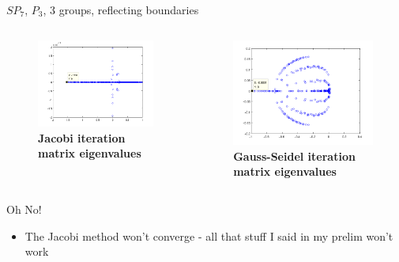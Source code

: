 \documentclass{beamer}
\begin{document}
\begin{frame}{$SP_7$, $P_3$, 3 groups, reflecting boundaries}

  \begin{columns}

    \begin{column}{0.5\textwidth}
      \begin{figure}[h!]
        \centering
        \includegraphics[width=2.5in,clip]{SPn7P3G3.png}
        \caption{\textbf{Jacobi iteration matrix eigenvalues}}
      \end{figure}
    \end{column}

    \begin{column}{0.5\textwidth}
      \begin{figure}[h!]
        \centering
        \includegraphics[width=2.5in,clip]{gsSPn7P3G3.png}
        \caption{\textbf{Gauss-Seidel iteration matrix eigenvalues}}
      \end{figure}
    \end{column}

  \end{columns}

\end{frame}

\begin{frame}{Oh No!}

  \begin{itemize}
    \item The Jacobi method won't converge - all that stuff I said in
      my prelim won't work
  \end{itemize}

\end{frame}
\end{document}
